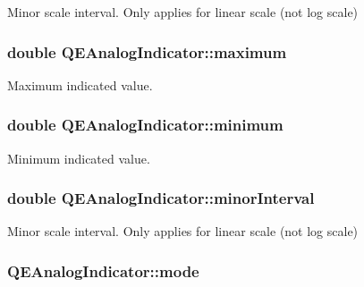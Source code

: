 \label{classQEAnalogIndicator_a9b3fb4ab140aacdaa66b0c02df3d5a3e}
Minor scale interval. Only applies for linear scale (not log scale) \hypertarget{classQEAnalogIndicator_ab18f5d6ec3bac26d8bd3e200be49942a}{
\subsubsection[{maximum}]{\setlength{\rightskip}{0pt plus 5cm}double QEAnalogIndicator::maximum}}
\label{classQEAnalogIndicator_ab18f5d6ec3bac26d8bd3e200be49942a}
Maximum indicated value. \hypertarget{classQEAnalogIndicator_a1a1951474ce2320093474dd6d85b6c06}{
\subsubsection[{minimum}]{\setlength{\rightskip}{0pt plus 5cm}double QEAnalogIndicator::minimum}}
\label{classQEAnalogIndicator_a1a1951474ce2320093474dd6d85b6c06}
Minimum indicated value. \hypertarget{classQEAnalogIndicator_a8727d8c84409a4b1c51c0c4140c65a45}{
\subsubsection[{minorInterval}]{\setlength{\rightskip}{0pt plus 5cm}double QEAnalogIndicator::minorInterval}}
\label{classQEAnalogIndicator_a8727d8c84409a4b1c51c0c4140c65a45}
Minor scale interval. Only applies for linear scale (not log scale) \hypertarget{classQEAnalogIndicator_acfe714eddf4dbffca49c3719e006027d}{
\subsubsection[{mode}]{ QEAnalogIndicator::mode}}
